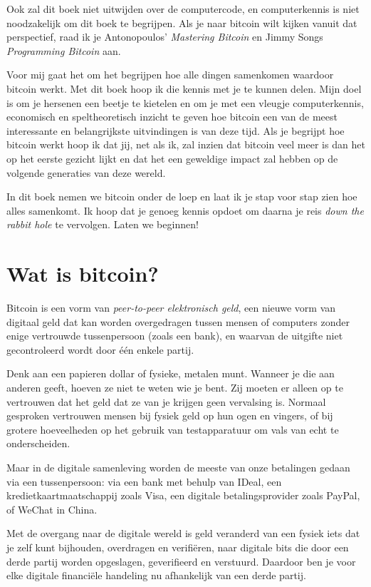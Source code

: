 \documentclass[smalldemyvopaper,11pt,twoside,onecolumn,openright,extrafontsizes]{memoir}
\begin{document}
Ook zal dit boek niet uitwijden over de computercode, en computerkennis is niet noodzakelijk om dit boek te begrijpen. Als je naar bitcoin wilt kijken vanuit dat perspectief, raad ik je Antonopoulos' \textit{Mastering Bitcoin} en Jimmy Songs \textit{Programming Bitcoin} aan.

Voor mij gaat het om het begrijpen hoe alle dingen samenkomen waardoor bitcoin werkt. Met dit boek hoop ik die kennis met je te kunnen delen. Mijn doel is om je hersenen een beetje te kietelen en om je met een vleugje computerkennis, economisch en speltheoretisch inzicht te geven hoe bitcoin een van de meest interessante en belangrijkste uitvindingen is van deze tijd. Als je begrijpt hoe bitcoin werkt hoop ik dat jij, net als ik, zal inzien dat bitcoin veel meer is dan het op het eerste gezicht lijkt en dat het een geweldige impact zal hebben op de volgende generaties van deze wereld.

In dit boek nemen we bitcoin onder de loep en laat ik je stap voor stap zien hoe alles samenkomt. Ik hoop dat je genoeg kennis opdoet om daarna je reis \textit{down the rabbit hole} te vervolgen. Laten we beginnen! 

\clearpage
\mainmatter
\pagestyle{plain}


\chapter{Wat is bitcoin?}

Bitcoin is een vorm van \textit{peer-to-peer elektronisch geld}, een nieuwe vorm van digitaal geld dat kan worden overgedragen tussen mensen of computers zonder enige vertrouwde tussenpersoon (zoals een bank), en waarvan de uitgifte niet gecontroleerd wordt door één enkele partij. 

Denk aan een papieren dollar of fysieke, metalen munt. Wanneer je die aan anderen geeft, hoeven ze niet te weten wie je bent. Zij moeten er alleen op te vertrouwen dat het geld dat ze van je krijgen geen vervalsing is. Normaal gesproken vertrouwen mensen bij fysiek geld op hun ogen en vingers, of bij grotere hoeveelheden op het gebruik van testapparatuur om vals van echt te onderscheiden.

Maar in de digitale samenleving worden de meeste van onze betalingen gedaan via een tussenpersoon: via een bank met behulp van IDeal, een kredietkaartmaatschappij zoals Visa, een digitale betalingsprovider zoals PayPal, of WeChat in China.

Met de overgang naar de digitale wereld is geld veranderd van een fysiek iets dat je zelf kunt bijhouden, overdragen en verifiëren, naar digitale bits die door een derde partij worden opgeslagen, geverifieerd en verstuurd. Daardoor ben je voor elke digitale financiële handeling nu afhankelijk van een derde partij. 
\end{document}
